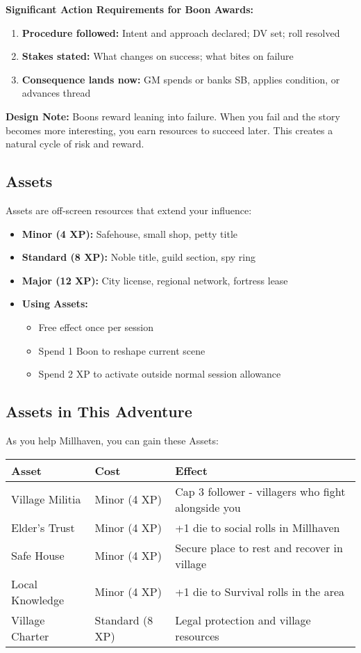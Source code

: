 \documentclass[11pt]{article}
\begin{document}
\textbf{Significant Action Requirements for Boon Awards:}
\begin{enumerate}
\item \textbf{Procedure followed:} Intent and approach declared; DV set; roll resolved
\item \textbf{Stakes stated:} What changes on success; what bites on failure
\item \textbf{Consequence lands now:} GM spends or banks SB, applies condition, or advances thread
\end{enumerate}

\textbf{Design Note:} Boons reward leaning into failure. When you fail and the story becomes more interesting, you earn resources to succeed later. This creates a natural cycle of risk and reward.

\subsection{Assets}

Assets are off-screen resources that extend your influence:
\begin{itemize}
\item \textbf{Minor (4 XP):} Safehouse, small shop, petty title
\item \textbf{Standard (8 XP):} Noble title, guild section, spy ring
\item \textbf{Major (12 XP):} City license, regional network, fortress lease
\item \textbf{Using Assets:}
   \begin{itemize}
   \item Free effect once per session
   \item Spend 1 Boon to reshape current scene
   \item Spend 2 XP to activate outside normal session allowance
   \end{itemize}
\end{itemize}

\subsection{Assets in This Adventure}

As you help Millhaven, you can gain these Assets:

\begin{center}
\begin{tabular}{|l|l|l|}
\hline
\textbf{Asset} & \textbf{Cost} & \textbf{Effect} \\
\hline
Village Militia & Minor (4 XP) & Cap 3 follower - villagers who fight alongside you \\
Elder's Trust & Minor (4 XP) & +1 die to social rolls in Millhaven \\
Safe House & Minor (4 XP) & Secure place to rest and recover in village \\
Local Knowledge & Minor (4 XP) & +1 die to Survival rolls in the area \\
Village Charter & Standard (8 XP) & Legal protection and village resources \\
\hline
\end{tabular}
\end{center}
\end{document}
